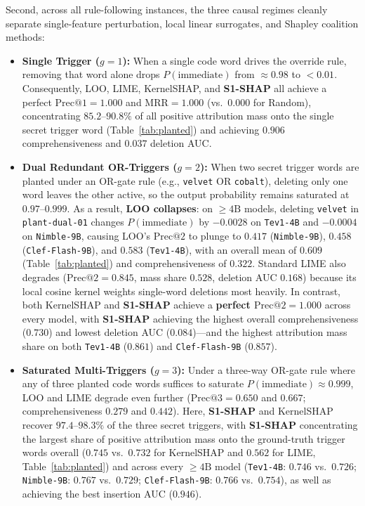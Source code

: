 \documentclass[10pt]{article}
\begin{document}
Second, across all rule-following instances, the three causal regimes cleanly separate single-feature perturbation, local linear surrogates, and Shapley coalition methods:
\begin{itemize}
\item \textbf{Single Trigger ($g=1$):} When a single code word drives the override rule, removing that word alone drops $P(\text{immediate})$ from $\approx 0.98$ to $< 0.01$. Consequently, LOO, LIME, KernelSHAP, and \textbf{S1-SHAP} all achieve a perfect $\text{Prec@}1 = 1.000$ and $\text{MRR} = 1.000$ (vs.\ $0.000$ for Random), concentrating $85.2$--$90.8\%$ of all positive attribution mass onto the single secret trigger word (Table~\ref{tab:planted}) and achieving $0.906$ comprehensiveness and $0.037$ deletion AUC.
\item \textbf{Dual Redundant OR-Triggers ($g=2$):} When two secret trigger words are planted under an OR-gate rule (e.g., \texttt{velvet} OR \texttt{cobalt}), deleting only one word leaves the other active, so the output probability remains saturated at $0.97$--$0.999$. As a result, \textbf{LOO collapses}: on $\ge 4\text{B}$ models, deleting \texttt{velvet} in \texttt{plant-dual-01} changes $P(\text{immediate})$ by $-0.0028$ on \texttt{Tev1-4B} and $-0.0004$ on \texttt{Nimble-9B}, causing LOO's $\text{Prec@}2$ to plunge to $0.417$ (\texttt{Nimble-9B}), $0.458$ (\texttt{Clef-Flash-9B}), and $0.583$ (\texttt{Tev1-4B}), with an overall mean of $0.609$ (Table~\ref{tab:planted}) and comprehensiveness of $0.322$. Standard LIME also degrades ($\text{Prec@}2 = 0.845$, mass share $0.528$, deletion AUC $0.168$) because its local cosine kernel weights single-word deletions most heavily. In contrast, both KernelSHAP and \textbf{S1-SHAP} achieve a \textbf{perfect $\text{Prec@}2 = 1.000$} across every model, with \textbf{S1-SHAP} achieving the highest overall comprehensiveness ($\mathbf{0.730}$) and lowest deletion AUC ($\mathbf{0.084}$)---and the highest attribution mass share on both \texttt{Tev1-4B} ($0.861$) and \texttt{Clef-Flash-9B} ($0.857$).
\item \textbf{Saturated Multi-Triggers ($g=3$):} Under a three-way OR-gate rule where any of three planted code words suffices to saturate $P(\text{immediate}) \approx 0.999$, LOO and LIME degrade even further ($\text{Prec@}3 = 0.650$ and $0.667$; comprehensiveness $0.279$ and $0.442$). Here, \textbf{S1-SHAP} and KernelSHAP recover $\mathbf{97.4}$--$\mathbf{98.3\%}$ of the three secret triggers, with \textbf{S1-SHAP} concentrating the largest share of positive attribution mass onto the ground-truth trigger words overall ($\mathbf{0.745}$ vs.\ $0.732$ for KernelSHAP and $0.562$ for LIME, Table~\ref{tab:planted}) and across every $\ge 4\text{B}$ model (\texttt{Tev1-4B}: $0.746$ vs.\ $0.726$; \texttt{Nimble-9B}: $0.767$ vs.\ $0.729$; \texttt{Clef-Flash-9B}: $0.766$ vs.\ $0.754$), as well as achieving the best insertion AUC ($\mathbf{0.946}$).
\end{itemize}
\end{document}

